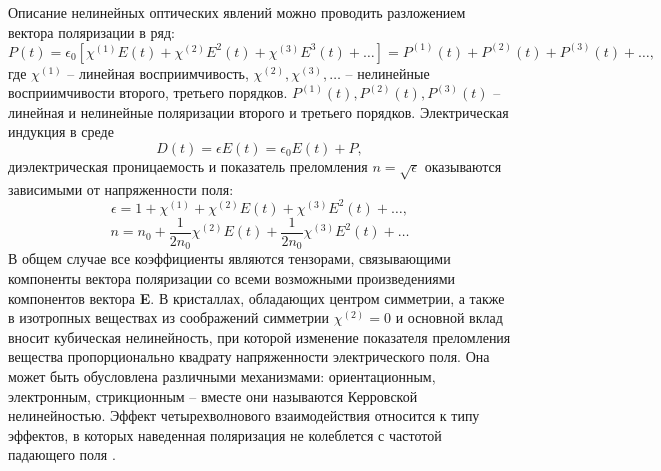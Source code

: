 Описание нелинейных оптических явлений можно проводить разложением вектора поляризации в ряд:
%
\begin{equation}
P(t)=\epsilon_0[\chi^{(1)}E(t)+\chi^{(2)}E^2(t)+\chi^{(3)}E^3(t)+\dots] =P^{(1)}(t)+P^{(2)}(t)+P^{(3)}(t)+\dots,
\end{equation}
%
где $\chi^{(1)}$ -- линейная восприимчивость, $\chi^{(2)},\chi^{(3)},\dots$ -- нелинейные восприимчивости второго, третьего порядков. $P^{(1)}(t),P^{(2)}(t),P^{(3)}(t)$ -- линейная и нелинейные поляризации второго и третьего порядков. Электрическая индукция в среде
%
\begin{equation}
D(t)=\epsilon E(t)=\epsilon_0E(t)+P,
\end{equation}
%
диэлектрическая проницаемость и показатель преломления $n=\sqrt{\epsilon}$ оказываются зависимыми от напряженности поля:
%
\begin{equation}
\epsilon=1+\chi^{(1)}+\chi^{(2)}E(t)+\chi^{(3)}E^2(t)+\dots,
\end{equation}
\begin{equation}
n=n_0+\frac{1}{2n_0}\chi^{(2)}E(t)+\frac{1}{2n_0}\chi^{(3)}E^2(t)+\dots
\end{equation}
%
В общем случае все коэффициенты являются тензорами, связывающими компоненты вектора поляризации со всеми возможными произведениями компонентов вектора \textbf{E}. В кристаллах, обладающих центром симметрии, а также в изотропных веществах из соображений симметрии $\chi^{(2)}=0$ и основной вклад вносит кубическая нелинейность, при которой изменение показателя преломления вещества пропорционально квадрату напряженности электрического поля. Она может быть обусловлена различными механизмами: ориентационным, электронным, стрикционным -- вместе они называются Керровской нелинейностью. Эффект четырехволнового взаимодействия относится к типу эффектов, в которых наведенная поляризация не колеблется с частотой падающего поля \cite{Gorodetsky}.

